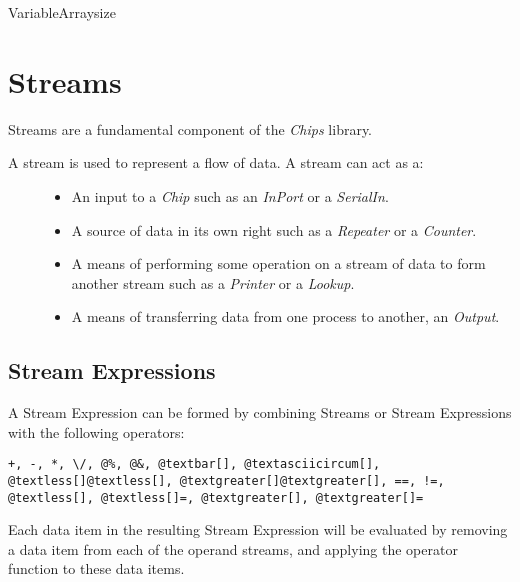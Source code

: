 \documentclass[letterpaper,10pt,english]{manual}
\begin{document}
\hypertarget{chips.VariableArray}{}\begin{classdesc}{VariableArray}{size}\end{classdesc}


\section{Streams}
\hypertarget{module-chips.streams}{}
\modulesynopsis{}
Streams are a fundamental component of the \emph{Chips} library.
\begin{description}
\item[{A stream is used to represent a flow of data. A stream can act as a:}] \leavevmode\begin{itemize}
\item {} 
An input to a \emph{Chip} such as an \emph{InPort} or a \emph{SerialIn}.

\item {} 
A source of data in its own right such as a \emph{Repeater} or a \emph{Counter}.

\item {} 
A means of performing some operation on a stream of data to form 
another stream such as a \emph{Printer} or a \emph{Lookup}.

\item {} 
A means of transferring data from one process to another, an \emph{Output}.

\end{itemize}

\end{description}


\subsection{Stream Expressions}

A Stream Expression can be formed by combining Streams or Stream Expressions
with the following operators:

\begin{Verbatim}[commandchars=@\[\]]
+, -, *, \/, @%, @&, @textbar[], @textasciicircum[], @textless[]@textless[], @textgreater[]@textgreater[], ==, !=, @textless[], @textless[]=, @textgreater[], @textgreater[]=
\end{Verbatim}

Each data item in the resulting Stream Expression will be evaluated by removing
a data item from each of the operand streams, and applying the operator
function to these data items.
\end{document}
